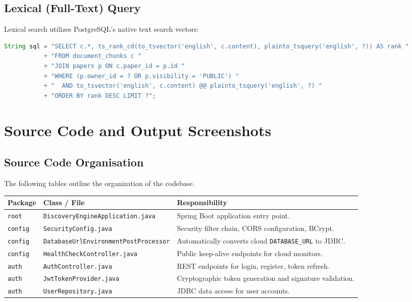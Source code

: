 \documentclass[11pt,a4paper,titlepage]{report}
\begin{document}
\section{Lexical (Full-Text) Query}
Lexical search utilizes PostgreSQL's native text search vectors:
\begin{lstlisting}[language=Java, caption={Lexical Full-Text Query via JdbcTemplate}]
String sql = "SELECT c.*, ts_rank_cd(to_tsvector('english', c.content), plainto_tsquery('english', ?)) AS rank "
           + "FROM document_chunks c "
           + "JOIN papers p ON c.paper_id = p.id "
           + "WHERE (p.owner_id = ? OR p.visibility = 'PUBLIC') "
           + "  AND to_tsvector('english', c.content) @@ plainto_tsquery('english', ?) "
           + "ORDER BY rank DESC LIMIT ?";
\end{lstlisting}
\chapter{Source Code and Output Screenshots}

\section{Source Code Organisation}
The following tables outline the organization of the codebase.

\begin{center}
\label{tab:code_core}
\vspace{3pt}
\begin{tabularx}{\textwidth}{llX}
\toprule
\textbf{Package} & \textbf{Class / File} & \textbf{Responsibility} \\
\midrule
\texttt{root} & \texttt{DiscoveryEngineApplication.java} & Spring Boot application entry point. \\
\texttt{config} & \texttt{SecurityConfig.java} & Security filter chain, CORS configuration, BCrypt. \\
\texttt{config} & \texttt{DatabaseUrlEnvironmentPostProcessor} & Automatically converts cloud \texttt{DATABASE\_URL} to JDBC. \\
\texttt{config} & \texttt{HealthCheckController.java} & Public keep-alive endpoints for cloud monitors. \\
\texttt{auth} & \texttt{AuthController.java} & REST endpoints for login, register, token refresh. \\
\texttt{auth} & \texttt{JwtTokenProvider.java} & Cryptographic token generation and signature validation. \\
\texttt{auth} & \texttt{UserRepository.java} & JDBC data access for user accounts. \\
\bottomrule
\end{tabularx}
\end{center}
\end{document}
